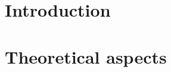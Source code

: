 \documentclass[Courlis]{../../data/TelemacDoc} %
\begin{document}
\let\cleardoublepage\clearpage

\title{\courlis}
\subtitle{User Manual}
\version{\telmaversion}
\date{\today}
\maketitle
\clearpage



\newpage

\thispagestyle{empty}

\TelemacCopyright{}




\pagestyle{empty} %

\tableofcontents%


\pagestyle{fancy} %

\printnomenclature

\chapter*{Introduction}\label{intro}

\newpage
\chapter{Theoretical aspects}\label{chap1}

\newpage
\end{document}
